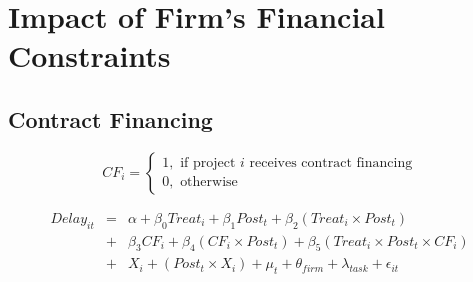 \documentclass[
]{article}
\begin{document}
\hypertarget{impact-of-firms-financial-constraints}{%
\section{Impact of Firm's Financial
Constraints}\label{impact-of-firms-financial-constraints}}

\hypertarget{contract-financing}{%
\subsection{Contract Financing}\label{contract-financing}}

\[ CF_i = \begin{cases} 1, \text{ if project } i \text{ receives contract financing}\\
0, \text{ otherwise} \end{cases}\]

\[ \begin{aligned}
Delay_{it} &=& \alpha+\beta_0 Treat_i + \beta_1 Post_t + \beta_2 (Treat_i \times Post_t) \\
&+&\beta_3 CF_i + \beta_4 (CF_i \times Post_t) + \beta_5 (Treat_i \times Post_t \times CF_i) \\ 
&+&X_i + (Post_t \times X_i) + \mu_t + \theta_{firm} + \lambda_{task}+ \epsilon_{it}
\end{aligned}\]
\end{document}
